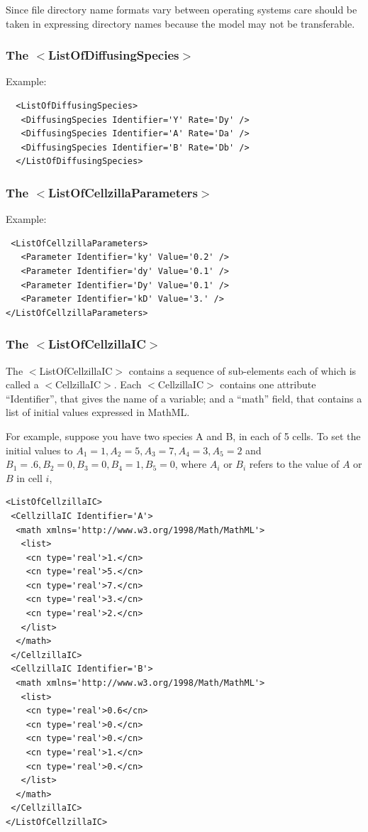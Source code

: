 \documentclass[12pt,letterpaper]{article}
\begin{document}
Since file directory name formats vary between operating systems care should be taken in expressing directory names because the model may not be transferable. 


\subsubsection{The $<$ListOfDiffusingSpecies$>$}

Example:
\begin{verbatim}
  <ListOfDiffusingSpecies>
   <DiffusingSpecies Identifier='Y' Rate='Dy' />
   <DiffusingSpecies Identifier='A' Rate='Da' />
   <DiffusingSpecies Identifier='B' Rate='Db' />
  </ListOfDiffusingSpecies>
\end{verbatim}


\subsubsection{The $<$ListOfCellzillaParameters$>$}

Example:
\begin{verbatim}
 <ListOfCellzillaParameters>
   <Parameter Identifier='ky' Value='0.2' />
   <Parameter Identifier='dy' Value='0.1' />
   <Parameter Identifier='Dy' Value='0.1' />
   <Parameter Identifier='kD' Value='3.' />
</ListOfCellzillaParameters>
\end{verbatim}



\subsubsection{The $<$ListOfCellzillaIC$>$}

The {\ttfamily $<$ListOfCellzillaIC$>$} contains a sequence of sub-elements each of which is called a {\ttfamily $<$CellzillaIC$>$}. Each {\ttfamily $<$CellzillaIC$>$} contains one attribute {\ttfamily``Identifier''}, that gives the name of a variable;  and a {\ttfamily ``math''} field, that contains a list of initial values expressed in MathML.

For example, suppose you have two species A and B, in each of 5 cells. To set the initial values to
$A_1=1, A_2=5, A_3=7, A_4=3, A_5=2$ and $B_1=.6, B_2=0, B_3=0, B_4=1, B_5=0$, where $A_i$ or $B_i$ refers to the value of $A$ or $B$ in cell $i$, 

\begin{verbatim}
<ListOfCellzillaIC>
 <CellzillaIC Identifier='A'>
  <math xmlns='http://www.w3.org/1998/Math/MathML'>
   <list>
    <cn type='real'>1.</cn>
    <cn type='real'>5.</cn>
    <cn type='real'>7.</cn>
    <cn type='real'>3.</cn>
    <cn type='real'>2.</cn>
   </list>
  </math>
 </CellzillaIC>
 <CellzillaIC Identifier='B'>
  <math xmlns='http://www.w3.org/1998/Math/MathML'>
   <list>
    <cn type='real'>0.6</cn>
    <cn type='real'>0.</cn>
    <cn type='real'>0.</cn>
    <cn type='real'>1.</cn>
    <cn type='real'>0.</cn>
   </list>
  </math>
 </CellzillaIC>
</ListOfCellzillaIC>
\end{verbatim}
\end{document}
